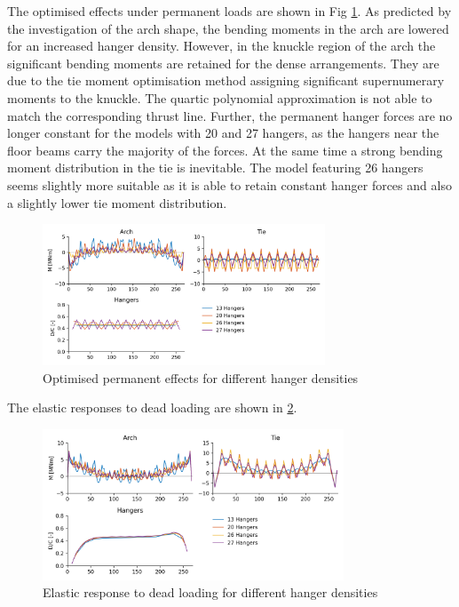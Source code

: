The optimised effects under permanent loads are shown in Fig \ref{fig:hd_permanent}. As predicted by the investigation of the arch shape, the bending moments in the arch are lowered for an increased hanger density. However, in the knuckle region of the arch the significant bending moments are retained for the dense arrangements. They are due to the tie moment optimisation method assigning significant supernumerary moments to the knuckle. The quartic polynomial approximation is not able to match the corresponding thrust line. Further, the permanent hanger forces are no longer constant for the models with 20 and 27 hangers, as the hangers near the floor beams carry the majority of the forces. At the same time a strong bending moment distribution in the tie is inevitable. The model featuring 26 hangers seems slightly more suitable as it is able to retain constant hanger forces and also a slightly lower tie moment distribution.

\begin{figure}[H]
    \centering
    \includegraphics[width=0.75\textwidth]{calculations/hanger amount comparison/permanent state.png}
    \caption{Optimised permanent effects for different hanger densities}
    \label{fig:hd_permanent}
\end{figure}

The elastic responses to dead loading are shown in \cref{fig:hd_elastic_response_dl}.

\begin{figure}[H]
    \centering
    \includegraphics[width=0.8\textwidth]{calculations/hanger amount comparison/dead load.png}
    \caption{Elastic response to dead loading for different hanger densities}
    \label{fig:hd_elastic_response_dl}
\end{figure}

